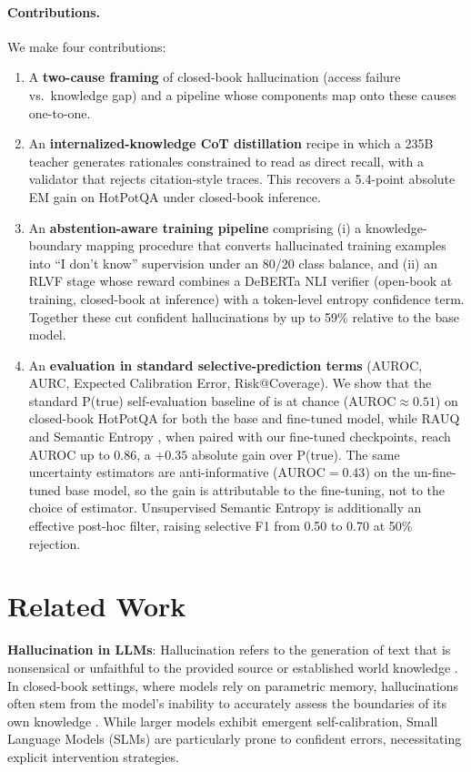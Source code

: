 \documentclass[11pt]{article}
\begin{document}
\paragraph{Contributions.} We make four contributions:
\begin{enumerate}
\item A \textbf{two-cause framing} of closed-book hallucination (access failure vs.\ knowledge gap) and a pipeline whose components map onto these causes one-to-one.
\item An \textbf{internalized-knowledge CoT distillation} recipe in which a 235B teacher generates rationales constrained to read as direct recall, with a validator that rejects citation-style traces. This recovers a 5.4-point absolute EM gain on HotPotQA under closed-book inference.
\item An \textbf{abstention-aware training pipeline} comprising (i) a knowledge-boundary mapping procedure that converts hallucinated training examples into ``I don't know'' supervision under an 80/20 class balance, and (ii) an RLVF stage whose reward combines a DeBERTa NLI verifier (open-book at training, closed-book at inference) with a token-level entropy confidence term. Together these cut confident hallucinations by up to 59\% relative to the base model.
\item An \textbf{evaluation in standard selective-prediction terms} (AUROC, AURC, Expected Calibration Error, Risk@Coverage). We show that the standard P(true) self-evaluation baseline of \citet{kadavath2022language} is at chance ($\text{AUROC} \approx 0.51$) on closed-book HotPotQA for both the base and fine-tuned model, while RAUQ \cite{vazhentsev2025rauq} and Semantic Entropy \cite{Farquhar2024Detecting}, when paired with our fine-tuned checkpoints, reach AUROC up to $0.86$, a $+0.35$ absolute gain over P(true). The same uncertainty estimators are anti-informative ($\text{AUROC} = 0.43$) on the un-fine-tuned base model, so the gain is attributable to the fine-tuning, not to the choice of estimator. Unsupervised Semantic Entropy is additionally an effective post-hoc filter, raising selective F1 from 0.50 to 0.70 at 50\% rejection.
\end{enumerate}

\section{Related Work}

\textbf{Hallucination in LLMs}: Hallucination refers to the generation of text that is nonsensical or unfaithful to the provided source or established world knowledge \cite{ji2023survey}. In closed-book settings, where models rely on parametric memory, hallucinations often stem from the model's inability to accurately assess the boundaries of its own knowledge \cite{kadavath2022language}. While larger models exhibit emergent self-calibration, Small Language Models (SLMs) are particularly prone to confident errors, necessitating explicit intervention strategies.
\end{document}
